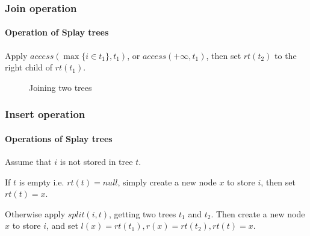 \documentclass{beamer}
\theoremstyle{plain}
\begin{document}
    \begin{frame}
        \frametitle{Join operation}
        \framesubtitle{Operation of Splay trees}
    
        Apply $access(\max\{i \in t_1\}, t_1)$, or $access(+\infty, t_1)$, then set $rt(t_2)$ to the right child of $rt(t_1)$.
    
        \begin{figure}[fragile]
            \centering
            \quad
            \quad
            \caption{Joining two trees}
        \end{figure}
    \end{frame}

    \begin{frame}[fragile]
        \frametitle{Insert operation}
        \framesubtitle{Operations of Splay trees}
    
        Assume that $i$ is not stored in tree $t$. \pause

        If $t$ is empty i.e. $rt(t) = null$, simply create a new node $x$ to store $i$, then set $rt(t) = x$. \pause

        Otherwise apply $split(i, t)$, getting two trees $t_1$ and $t_2$. Then create a new node $x$ to store $i$, and set $l(x) = rt(t_1), r(x) = rt(t_2), rt(t) = x$.

    \end{frame}
\end{document}

